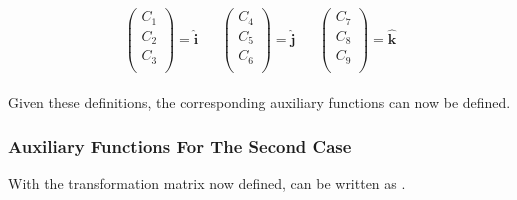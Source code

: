 \begin{align} \label{eq:transCoeff}
\begin{split}
\begin{pmatrix}
C_{1} \\
C_{2} \\
C_{3} \\
\end{pmatrix}
=
\mathbf{\hat{i}}
\end{split}
&
\begin{split}
\begin{pmatrix}
C_{4} \\
C_{5} \\
C_{6} \\
\end{pmatrix}
=
\mathbf{\hat{j}}
\end{split}
&
\begin{split}
\begin{pmatrix}
C_{7} \\
C_{8} \\
C_{9} \\
\end{pmatrix}
=
\mathbf{\hat{k}}
\end{split}
\end{align}

\noindent
Given these definitions, the corresponding auxiliary functions can now be defined. 

\subsubsection{Auxiliary Functions For The Second Case}
\label{subsubsec:auxFsecCase}
With the transformation matrix now defined,  can be written as .

